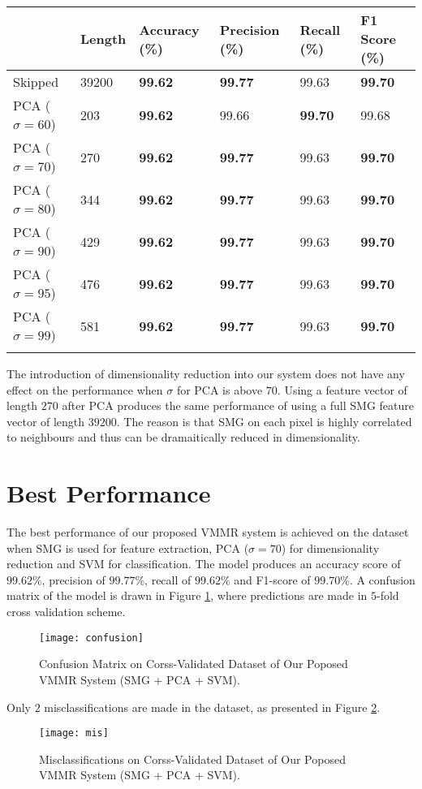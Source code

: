 \begin{longtable}[]{@{}llllll@{}}
\toprule
& Length & Accuracy (\%) & Precision (\%) & Recall (\%) & F1 Score
(\%)\tabularnewline
\midrule
\endhead
Skipped & 39200 & \textbf{99.62} & \textbf{99.77} & 99.63 &
\textbf{99.70}\tabularnewline
PCA (\(\sigma=60\)) & 203 & \textbf{99.62} & 99.66 & \textbf{99.70} &
99.68\tabularnewline
PCA (\(\sigma=70\)) & 270 & \textbf{99.62} & \textbf{99.77} & 99.63 &
\textbf{99.70}\tabularnewline
PCA (\(\sigma=80\)) & 344 & \textbf{99.62} & \textbf{99.77} & 99.63 &
\textbf{99.70}\tabularnewline
PCA (\(\sigma=90\)) & 429 & \textbf{99.62} & \textbf{99.77} & 99.63 &
\textbf{99.70}\tabularnewline
PCA (\(\sigma=95\)) & 476 & \textbf{99.62} & \textbf{99.77} & 99.63 &
\textbf{99.70}\tabularnewline
PCA (\(\sigma=99\)) & 581 & \textbf{99.62} & \textbf{99.77} & 99.63 &
\textbf{99.70}\tabularnewline
\bottomrule
\label{tab:pca}
\end{longtable}

The introduction of dimensionality reduction into our system does not have any effect on the performance when $\sigma$ for PCA is above $70$.
Using a feature vector of length $270$ after PCA produces the same performance of using a full SMG feature vector of length $39200$.
The reason is that SMG on each pixel is highly correlated to neighbours and thus can be dramaitically reduced in dimensionality.


\section{Best Performance}

The best performance of our proposed VMMR system is achieved on the dataset when SMG is used for feature extraction, PCA ($\sigma = 70$) for dimensionality reduction and SVM for classification.
The model produces an accuracy score of $99.62\%$, precision of $99.77\%$, recall of $99.62\%$ and F1-score of $99.70\%$.
A confusion matrix of the model is drawn in Figure \ref{fig:confusion}, where predictions are made in $5$-fold cross validation scheme.

\begin{figure}
\centering
\texttt{[image: confusion]}
\caption{Confusion Matrix on Corss-Validated Dataset of Our Poposed VMMR System (SMG + PCA + SVM).}
\label{fig:confusion}
\end{figure}

Only $2$ misclassifications are made in the dataset, as presented in Figure \ref{fig:mis}. 

\begin{figure}
\centering
\texttt{[image: mis]}
\caption{Misclassifications on Corss-Validated Dataset of Our Poposed VMMR System (SMG + PCA + SVM).}
\label{fig:mis}
\end{figure}


